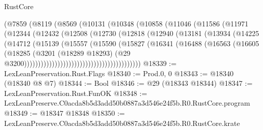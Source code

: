 \begin{lexlean}{RustCore}
\begin{coremodule}
                            (@7859
                              (@8119
                                (@8569
                                  (@10131
                                    (@10348
                                      (@10858
                                        (@11046
                                          (@11586
                                            (@11971
                                              (@12344
                                                (@12432
                                                  (@12508
                                                    (@12730
                                                      (@12818
                                                        (@12940
                                                          (@13181
                                                            (@13934
                                                              (@14225
                                                                (@14712
                                                                  (@15139
                                                                    (@15557
                                                                      (@15590
                                                                        (@15827
                                                                          (@16341
                                                                            (@16488
                                                                              (@16563
                                                                                (@16605
                                                                                  (@18285
                                                                                    (@3201
                                                                                      (@18289
                                                                                        @18293)
                                                                                      (@29
                                                                                        @3200))))))))))))))))))))))))))))))))))))))))))
@18339 := LexLeanPreservation.Rust.Flags
@18340 := Prod.{0, 0}
@18343 := @18340 (@18340 @8 @7)
@18344 := Bool
@18346 := @29 (@18343 @18344)
@18347 := LexLeanPreservation.Rust.FunOK
@18348 := LexLeanPreserve.C0acda8b5d3add50b0887a3d546e24f5b.R0.RustCore.program
@18349 := @18347 @18348
@18350 := LexLeanPreserve.C0acda8b5d3add50b0887a3d546e24f5b.R0.RustCore.krate

\end{coremodule}
\end{lexlean}
